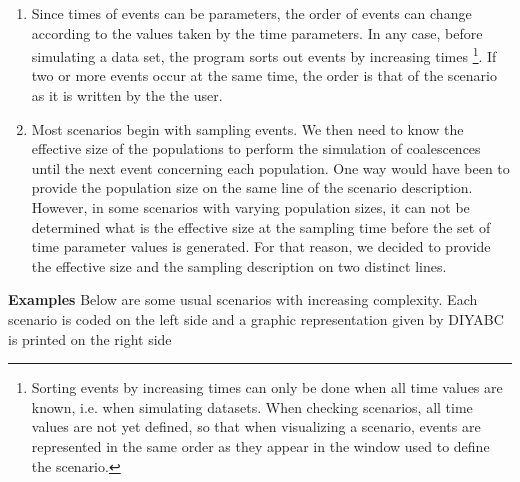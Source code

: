 \begin{enumerate}
 This is because, after the first line, population 2, which has merged
with population 1, does not "exist" anymore
(the surviving population is population 1). So, it cannot receive
lineages of population 3 as it should as a result of the second line.
The correct ways are either to put line 2 before line 1, or to change
line 2 to :\\
 \texttt{100 merge 1 3}.
\item Since times of events can be parameters, the order of events can change
according to the values taken by the time parameters. In any case,
before simulating a data set, the program sorts out events by increasing
times %
\footnote{ Sorting events by increasing times can only be done when all time
values are known, i.e. when simulating datasets. When checking scenarios,
all time values are not yet defined, so that when visualizing a scenario,
events are represented in the same order as they appear in the window
used to define the scenario.%
}. If two or more events occur at the same time, the order is that
of the scenario as it is written by the the user.
\item Most scenarios begin with sampling events. We then need to know the
effective size of the populations to perform the simulation of coalescences
until the next event concerning each population. One way would have
been to provide the population size on the same line of the scenario
description. However, in some scenarios with varying population sizes,
it can not be determined what is the effective size at the sampling
time before the set of time parameter values is generated. For that
reason, we decided to provide the effective size and the sampling
description on two distinct lines.
\end{enumerate}
\textbf{Examples} Below are some usual scenarios with increasing complexity.
Each scenario is coded on the left side and a graphic representation
given by DIYABC is printed on the right side
